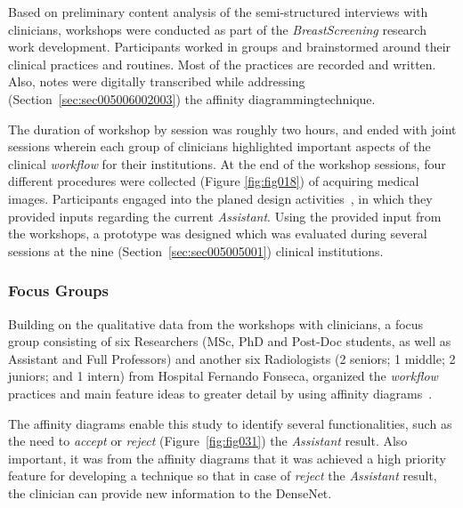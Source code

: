 Based on preliminary content analysis of the semi-structured interviews with clinicians, workshops were conducted as part of the {\it BreastScreening} research work development.
Participants worked in groups and brainstormed around their clinical practices and routines.
Most of the practices are recorded and written.
Also, notes were digitally transcribed while addressing (Section~\ref{sec:sec005006002003}) the affinity diagramming\footnotemark[30] technique.


The duration of workshop by session was roughly two hours, and ended with joint sessions wherein each group of clinicians highlighted important aspects of the clinical {\it workflow} for their institutions.
At the end of the workshop sessions, four different procedures were collected (Figure \ref{fig:fig018}) of acquiring medical images.
Participants engaged into the planed design activities~\cite{https://doi.org/10.13140/rg.2.2.16566.14403/1}, in which they provided inputs regarding the current {\it Assistant}.
Using the provided input from the workshops, a prototype was designed which was evaluated during several sessions at the nine (Section~\ref{sec:sec005005001}) clinical institutions.

\subsubsection{Focus Groups}
\label{sec:sec005006002002}

Building on the qualitative data from the workshops with clinicians, a focus group consisting of six Researchers (MSc, PhD and Post-Doc students, as well as Assistant and Full Professors) and another six Radiologists (2 seniors; 1 middle; 2 juniors; and 1 intern) from Hospital Fernando Fonseca, organized the {\it workflow} practices and main feature ideas to greater detail by using affinity diagrams~\cite{Harboe:2012:CSC:2145204.2145379, Hoiseth:2013:RGD:2468356.2468436}.

The affinity diagrams enable this study to identify several functionalities, such as the need to {\it accept} or {\it reject} (Figure~\ref{fig:fig031}) the {\it Assistant} result.
Also important, it was from the affinity diagrams that it was achieved a high priority feature for developing a technique so that in case of {\it reject} the {\it Assistant} result, the clinician can provide new information to the DenseNet.

